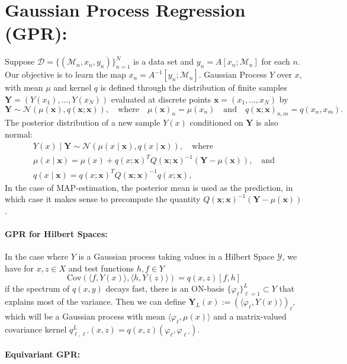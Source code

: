 \documentclass{article}
\newcommand{\manifold}{\mathcal{M}}
\newcommand{\data}{\mathcal{D}}
\newcommand{\yspace}{\mathcal{Y}}
\begin{document}
    \section{Gaussian Process Regression (GPR):}
    Suppose $\data = \{(\manifold_n, x_n, y_n)\}_{n=1}^N$ is a data set and $y_n = A[x_n; \manifold_n]$ for each $n$. Our objective is to learn the map $x_n = A^{-1}[y_n; \manifold_n]$.  Gaussian Process $Y$ over $x$, with mean $\mu$ and kernel $q$ is defined through the distribution of finite samples $\pmb Y = (Y(x_1),\dots, Y(x_N))$ evaluated at discrete points $\pmb x=(x_1, \dots, x_N)$ by 
    \[
        \pmb Y\sim \mathcal{N}(\mu(\pmb x), q(\pmb x; \pmb x)),\quad \text{where}\quad \mu(\pmb x)_n = \mu(x_n)\quad\text{and}\quad q(\pmb x; \pmb x)_{n,m} = q(x_n, x_m).
    \]
    The posterior distribution of a new sample $Y(x)$ conditioned on $\pmb Y$ is also normal:
    \begin{multline*}
        Y(x)\mid \pmb Y \sim \mathcal{N}(\mu(x\mid \pmb x), q(x\mid \pmb x)), \quad \text{where} \\
        \mu(x\mid \pmb x) = \mu(x) + q(x;\pmb x)^TQ(\pmb x;\pmb x)^{-1}(\pmb Y - \mu(\pmb x)), \quad\text{and}\\
        q(x\mid \pmb x) = q(x;\pmb x)^TQ(\pmb x;\pmb x)^{-1}q(x;\pmb x),
    \end{multline*}
    In the case of MAP-estimation, the posterior mean is used as the prediction, in which case it makes sense to precompute the quantity $Q(\pmb x; \pmb x)^{-1}(\pmb Y - \mu(\pmb x))$.

    \paragraph{GPR for Hilbert Spaces:}
    In the case where $Y$ is a Gaussian process taking values in a Hilbert Space $\yspace$, we have for $x,z\in X$ and test functions $h,f\in Y$
    \[
        \mathrm{Cov}(\langle f, Y(x)\rangle, \langle h, Y(z)\rangle) = q(x,z)[f,h]
    \]
    if the spectrum of $q(x,y)$ decays fast, there is an ON-basis $\{\varphi_\ell\}_{\ell=1}^L\subset Y$ that explains most of the variance. Then we can define $\pmb Y_L(x) := (\langle \varphi_\ell, Y(x)\rangle)_{\ell}$, which will be a Gaussian process with mean $\langle \varphi_\ell, \mu(x)\rangle$ and a matrix-valued covariance kernel $q^L_{\ell,\ell'}(x, z)=q(x, z)(\varphi_\ell, \varphi_{\ell'})$.


    \paragraph{Equivariant GPR:} 
    
\end{document}
